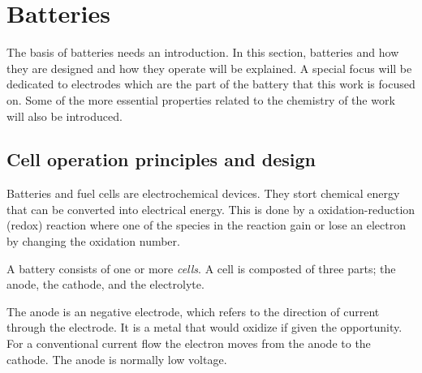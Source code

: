 \newcommand{\colVec}[1]{\begin{bmatrix} #1_0 \\ #1_1 \\ \vdots \\ #1_{n-1} \\ #1_{n} \end{bmatrix}}

\section{Batteries}
The basis of batteries needs an introduction. In this section, batteries and how they are designed and how they operate will be explained. A special focus will be dedicated to electrodes which are the part of the battery that this work is focused on. Some of the more essential properties related to the chemistry of the work will also be introduced. 



\subsection{Cell operation principles and design}
Batteries and fuel cells are electrochemical devices. They stort chemical energy that can be converted into electrical energy. This is done by a oxidation-reduction (redox) reaction where one of the species in the reaction gain or lose an electron by changing the oxidation number. 

A battery consists of one or more \textit{cells}. A cell is composted of three parts; the anode, the cathode, and the electrolyte.

The anode is an negative electrode, which refers to the direction of current through the electrode. It is a metal that would oxidize if given the opportunity. For a conventional current flow the electron moves from the anode to the cathode. The anode is normally low voltage.  

